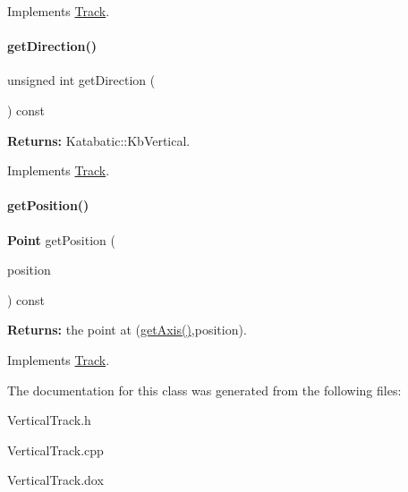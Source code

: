 Implements \mbox{\hyperlink{classKite_1_1Track_a6fa2bf0568a2b295dd7cd1f7207247d5}{Track}}.

\mbox{\label{classKite_1_1VerticalTrack_a0dd7cf705ace42c662c289955313b2e9}} 
\paragraph{\texorpdfstring{get\+Direction()}{getDirection()}}
{\footnotesize\ttfamily unsigned int get\+Direction (\begin{DoxyParamCaption}{ }\end{DoxyParamCaption}) const\hspace{0.3cm}{\ttfamily [virtual]}}

{\bfseries Returns\+:} Katabatic\+::\+Kb\+Vertical. 

Implements \mbox{\hyperlink{classKite_1_1Track_ae35b78590ed6aa546b626ef95f28c533}{Track}}.

\mbox{\label{classKite_1_1VerticalTrack_a6ab4f8026e4500918aa8721f1199f8b6}} 
\paragraph{\texorpdfstring{get\+Position()}{getPosition()}}
{\footnotesize\ttfamily \textbf{ Point} get\+Position (\begin{DoxyParamCaption}\item[{\textbf{ Db\+U\+::\+Unit}}]{position }\end{DoxyParamCaption}) const\hspace{0.3cm}{\ttfamily [virtual]}}

{\bfseries Returns\+:} the point at {\ttfamily }(\mbox{\hyperlink{classKite_1_1Track_ab5b5aaa5b318369feee6003dbad039c2}{get\+Axis()}},position). 

Implements \mbox{\hyperlink{classKite_1_1Track_a2a033f90e528d3d07aa33694dd733200}{Track}}.



The documentation for this class was generated from the following files\+:\begin{DoxyCompactItemize}
\item 
Vertical\+Track.\+h\item 
Vertical\+Track.\+cpp\item 
Vertical\+Track.\+dox\end{DoxyCompactItemize}

